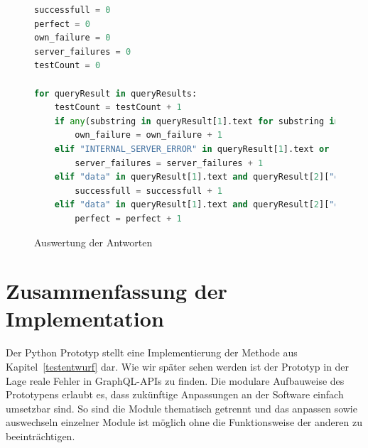 \begin{figure}
    \begin{lstlisting}[language=Python]
successfull = 0
perfect = 0
own_failure = 0
server_failures = 0
testCount = 0

for queryResult in queryResults:
    testCount = testCount + 1
    if any(substring in queryResult[1].text for substring in ["GRAPHQL_PARSE_FAILED", "GRAPHQL_VALIDATION_FAILED"]):
        own_failure = own_failure + 1
    elif "INTERNAL_SERVER_ERROR" in queryResult[1].text or r.StatusCode == 500:
        server_failures = server_failures + 1
    elif "data" in queryResult[1].text and queryResult[2]["expectedPathLength"] > queryResult[2]["pathLengthFromResult"]:
        successfull = successfull + 1
    elif "data" in queryResult[1].text and queryResult[2]["expectedPathLength"] == queryResult[2]["pathLengthFromResult"]:
        perfect = perfect + 1
    \end{lstlisting}
    \caption{Auswertung der Antworten}
    \label{auswert}
\end{figure}
\newpage

\section{Zusammenfassung der Implementation}

Der Python Prototyp stellt eine Implementierung der Methode aus Kapitel~\ref{testentwurf} dar.
Wie wir später sehen werden ist der Prototyp in der Lage reale Fehler in GraphQL-APIs zu finden.
Die modulare Aufbauweise des Prototypens erlaubt es, dass zukünftige Anpassungen an der Software einfach umsetzbar sind.
So sind die Module thematisch getrennt und das anpassen sowie auswechseln einzelner Module ist möglich ohne die Funktionsweise
der anderen zu beeinträchtigen.



